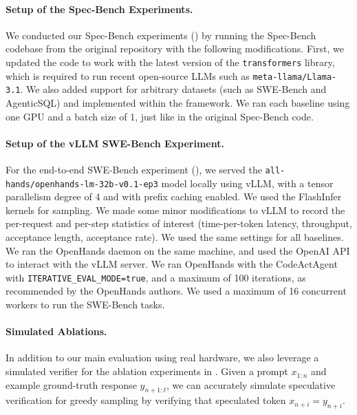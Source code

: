 \paragraph{Setup of the Spec-Bench Experiments.}
We conducted our Spec-Bench experiments () by running the Spec-Bench codebase from the original repository with the following modifications. First, we updated the code to work with the latest version of the \texttt{transformers} library, which is required to run recent open-source LLMs such as \texttt{meta-llama/Llama-3.1}. We also added support for arbitrary datasets (such as SWE-Bench and AgenticSQL) and implemented \SuffixDecoding within the framework. We ran each baseline using one GPU and a batch size of 1, just like in the original Spec-Bench code.

\paragraph{Setup of the vLLM SWE-Bench Experiment.}
For the end-to-end SWE-Bench experiment (), we served the \texttt{all-hands/openhands-lm-32b-v0.1-ep3} model locally using vLLM, with a tensor parallelism degree of 4 and with prefix caching enabled. We used the FlashInfer kernels for sampling. We made some minor modifications to vLLM to record the per-request and per-step statistics of interest (time-per-token latency, throughput, acceptance length, acceptance rate). We used the same settings for all baselines. We ran the OpenHands daemon on the same machine, and used the OpenAI API to interact with the vLLM server. We ran OpenHands with the CodeActAgent~\citep{wang2024executablecodeactionselicit} with \texttt{ITERATIVE\_EVAL\_MODE=true}, and a maximum of 100 iterations, as recommended by the OpenHands authors. We used a maximum of 16 concurrent workers to run the SWE-Bench tasks.

\paragraph{Simulated Ablations.}
In addition to our main evaluation using real hardware, we also leverage a simulated verifier for the ablation experiments in . Given a prompt \( x_{1:n} \) and example ground-truth response \( y_{n+1:t} \), we can accurately simulate speculative verification for greedy sampling by verifying that speculated token \( x_{n+i} = y_{n+i} \).

